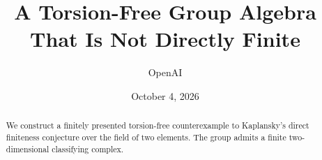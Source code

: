 \documentclass[11pt]{article}
\title{A Torsion-Free Group Algebra That Is Not Directly Finite}
\author{OpenAI}
\date{October 4, 2026}
\numberwithin{equation}{section}
\theoremstyle{definition}
\theoremstyle{remark}
\begin{document}
\maketitle
\begin{abstract}
We construct a finitely presented torsion-free counterexample to Kaplansky's
direct finiteness conjecture over the field of two elements. The group admits
a finite two-dimensional classifying complex.
\end{abstract}









\begingroup
\raggedright


\endgroup
\end{document}
